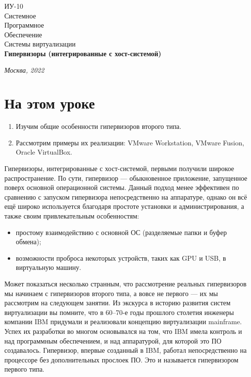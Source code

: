 \documentclass[14pt, a4paper]{article}
\begin{document}
\begin{titlepage}
    \topmargin=216pt
    \newpage
    \hangindent=0.7cm
    \huge ИУ-10\\
    Системное\\
    Программное\\
    Обеспечение\\
    Системы виртуализации\\
    \textbf{Гипервизоры (интегрированные с хост-системой)}

    \vspace{10cm}

    \begin{center}
        \small\textit{Москва, 2022}
    \end{center}
\end{titlepage}

\section*{На этом уроке}
\begin{enumerate}
    \item Изучим общие особенности гипервизоров второго типа.
    \item Рассмотрим примеры их реализации: VMware Workstation, VMware Fusion, Oracle VirtualBox.
\end{enumerate}

\tableofcontents
\newpage

Гипервизоры, интегрированные с хост-системой, первыми получили широкое распространение. По
сути, гипервизор — обыкновенное приложение, запущенное поверх основной операционной системы.
Данный подход менее эффективен по сравнению с запуском гипервизора непосредственно на
аппаратуре, однако он всё ещё широко используется благодаря простоте установки и
администрирования, а также своим привлекательным особенностям:
\begin{itemize}
    \item простому взаимодействию с основной ОС (разделяемые папки и буфер обмена);
    \item возможности проброса некоторых устройств, таких как GPU и USB, в виртуальную машину.
\end{itemize}

Может показаться несколько странным, что рассмотрение реальных гипервизоров мы начинаем с
гипервизоров второго типа, а вовсе не первого — их мы рассмотрим на следующем занятии. Из
экскурса в историю развития систем виртуализации вы помните, что в 60–70-е годы прошлого
столетия инженеры компании IBM придумали и реализовали концепцию виртуализации mainframe.
Успех их разработки во многом основывался на том, что IBM имела контроль и над программным
обеспечением, и над аппаратурой, для которой это ПО создавалось. Гипервизор, впервые созданный
в IBM, работал непосредственно на процессоре без дополнительных прослоек ПО. Это и называется
гипервизором первого типа.\\
\end{document}
